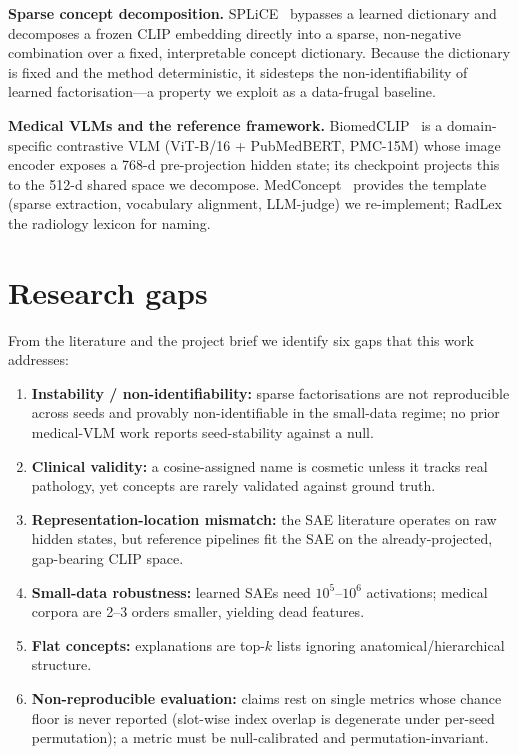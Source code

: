 \documentclass[sigconf, nonacm]{acmart}
\begin{document}
\textbf{Sparse concept decomposition.} SPLiCE~\cite{bhalla2024spliece} bypasses a learned dictionary and decomposes a frozen CLIP embedding directly into a sparse, non-negative combination over a fixed, interpretable concept dictionary. Because the dictionary is fixed and the method deterministic, it sidesteps the non-identifiability of learned factorisation---a property we exploit as a data-frugal baseline.

\textbf{Medical VLMs and the reference framework.} BiomedCLIP~\cite{zhang2023biomedclip} is a domain-specific contrastive VLM (ViT-B/16 + PubMedBERT, PMC-15M) whose image encoder exposes a 768-d pre-projection hidden state; its checkpoint projects this to the 512-d shared space we decompose. MedConcept~\cite{haque2026medconcept} provides the template (sparse extraction, vocabulary alignment, LLM-judge) we re-implement; RadLex~\cite{langlotz2006radlex} the radiology lexicon for naming.

\section{Research gaps}
From the literature and the project brief we identify six gaps that this work addresses:
\begin{enumerate}
  \item \textbf{Instability / non-identifiability:} sparse factorisations are not reproducible across seeds and provably non-identifiable in the small-data regime; no prior medical-VLM work reports seed-stability against a null.
  \item \textbf{Clinical validity:} a cosine-assigned name is cosmetic unless it tracks real pathology, yet concepts are rarely validated against ground truth.
  \item \textbf{Representation-location mismatch:} the SAE literature operates on raw hidden states, but reference pipelines fit the SAE on the already-projected, gap-bearing CLIP space.
  \item \textbf{Small-data robustness:} learned SAEs need $10^5$--$10^6$ activations; medical corpora are 2--3 orders smaller, yielding dead features.
  \item \textbf{Flat concepts:} explanations are top-$k$ lists ignoring anatomical/hierarchical structure.
  \item \textbf{Non-reproducible evaluation:} claims rest on single metrics whose chance floor is never reported (slot-wise index overlap is degenerate under per-seed permutation); a metric must be null-calibrated and permutation-invariant.
\end{enumerate}
\end{document}
